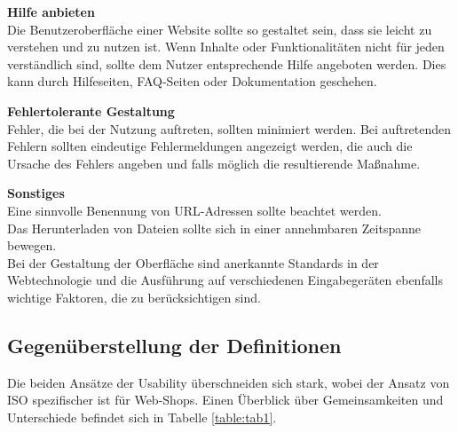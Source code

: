 \documentclass[utf8,biblatex]{lni}
\begin{document}
\textbf{Hilfe anbieten}\\
Die Benutzeroberfläche einer Website sollte so gestaltet sein, dass sie leicht zu verstehen und zu nutzen ist. Wenn Inhalte oder Funktionalitäten nicht für jeden verständlich sind, sollte dem Nutzer entsprechende Hilfe angeboten werden. Dies kann durch Hilfeseiten, FAQ-Seiten oder Dokumentation geschehen.

\textbf{Fehlertolerante Gestaltung}\\
Fehler, die bei der Nutzung auftreten, sollten minimiert werden. Bei auftretenden Fehlern sollten eindeutige Fehlermeldungen angezeigt werden, die auch die Ursache des Fehlers angeben und falls möglich die resultierende Maßnahme.

\textbf{Sonstiges}\\
Eine sinnvolle Benennung von URL-Adressen sollte beachtet werden.\\
Das Herunterladen von Dateien sollte sich in einer annehmbaren Zeitspanne bewegen. \\
Bei der Gestaltung der Oberfläche sind anerkannte Standards in der Webtechnologie und die Ausführung auf verschiedenen Eingabegeräten ebenfalls wichtige Faktoren, die zu berücksichtigen sind.

\subsection{Gegenüberstellung der Definitionen}
Die beiden Ansätze der Usability überschneiden sich stark, wobei der Ansatz von ISO spezifischer ist für Web-Shops. Einen Überblick über Gemeinsamkeiten und Unterschiede befindet sich in Tabelle \ref{table:tab1}.
\end{document}
